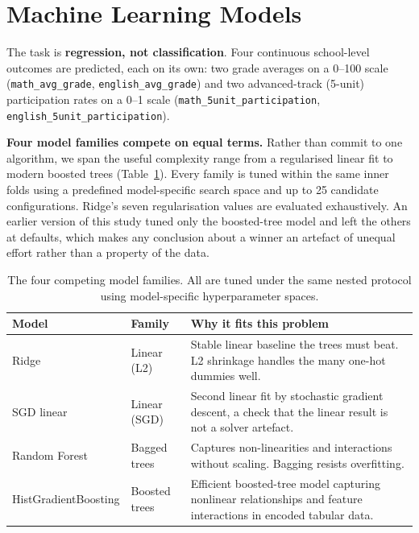 \section{Machine Learning Models}
\label{sec:models}

The task is \textbf{regression, not classification}. Four continuous
school-level outcomes are predicted, each on its own: two grade averages on a
0--100 scale (\texttt{math\_avg\_grade}, \texttt{english\_avg\_grade}) and two
advanced-track (5-unit) participation rates on a 0--1 scale
(\texttt{math\_5unit\_participation}, \texttt{english\_5unit\_participation}).

\textbf{Four model families compete on equal terms.} Rather than commit to one
algorithm, we span the useful complexity range from a regularised linear fit to
modern boosted trees (Table~\ref{tab:models}). Every family is tuned within the
same inner folds using a predefined model-specific search space and up to 25
candidate configurations. Ridge's seven regularisation values are evaluated
exhaustively. An earlier version of this study tuned only the boosted-tree model
and left the others at defaults, which makes any conclusion about a winner an
artefact of unequal effort rather than a property of the data.

\begin{table}[H]
\centering
\footnotesize
\renewcommand{\arraystretch}{1.15}
\caption{The four competing model families. All are tuned under the same nested
protocol using model-specific hyperparameter spaces.}
\label{tab:models}
\begin{tabular}{@{}>{\raggedright\arraybackslash}p{2.2cm}>{\raggedright\arraybackslash}p{1.9cm}>{\raggedright\arraybackslash}p{9.7cm}@{}}
\toprule
\textbf{Model} & \textbf{Family} & \textbf{Why it fits this problem} \\
\midrule
Ridge & Linear (L2) & Stable linear baseline the trees must beat. L2 shrinkage handles the many one-hot dummies well. \\
SGD linear & Linear (SGD) & Second linear fit by stochastic gradient descent, a check that the linear result is not a solver artefact. \\
Random Forest & Bagged trees & Captures non-linearities and interactions without scaling. Bagging resists overfitting. \\
Hist\-Gradient\-Boosting & Boosted trees & Efficient boosted-tree model capturing nonlinear relationships and feature interactions in encoded tabular data. \\
\bottomrule
\end{tabular}
\end{table}

